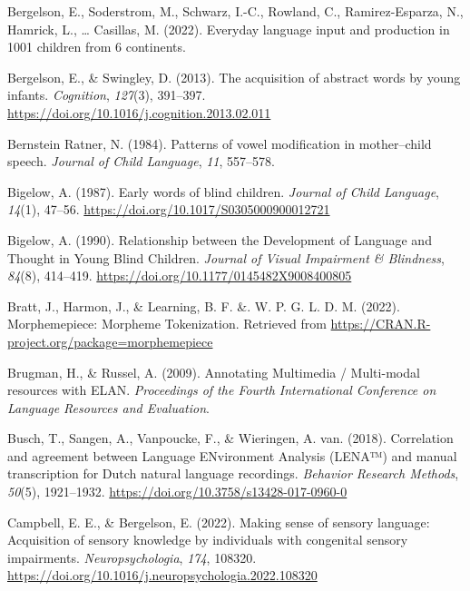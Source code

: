 \documentclass[
  man]{apa6}
\newlength{\cslhangindent}
\newlength{\cslentryspacingunit} %
\newenvironment{CSLReferences}[2] %
 {%
  \setlength{\parindent}{0pt}
  \ifodd #1
  \let\oldpar\par
  \def\par{\hangindent=\cslhangindent\oldpar}
  \fi
  \setlength{\parskip}{#2\cslentryspacingunit}
 }%
 {}
\begin{document}
\begin{CSLReferences}{1}{0}
\leavevmode{}%
Bergelson, E., Soderstrom, M., Schwarz, I.-C., Rowland, C., Ramirez-Esparza, N., Hamrick, L., \ldots{} Casillas, M. (2022). Everyday language input and production in 1001 children from 6 continents.

\leavevmode{}%
Bergelson, E., \& Swingley, D. (2013). The acquisition of abstract words by young infants. \emph{Cognition}, \emph{127}(3), 391--397. \url{https://doi.org/10.1016/j.cognition.2013.02.011}

\leavevmode{}%
Bernstein Ratner, N. (1984). Patterns of vowel modification in mother--child speech. \emph{Journal of Child Language}, \emph{11}, 557--578.

\leavevmode{}%
Bigelow, A. (1987). Early words of blind children. \emph{Journal of Child Language}, \emph{14}(1), 47--56. \url{https://doi.org/10.1017/S0305000900012721}

\leavevmode{}%
Bigelow, A. (1990). Relationship between the {Development} of {Language} and {Thought} in {Young} {Blind} {Children}. \emph{Journal of Visual Impairment \& Blindness}, \emph{84}(8), 414--419. \url{https://doi.org/10.1177/0145482X9008400805}

\leavevmode{}%
Bratt, J., Harmon, J., \& Learning, B. F. \&. W. P. G. L. D. M. (2022). Morphemepiece: {Morpheme} {Tokenization}. Retrieved from \url{https://CRAN.R-project.org/package=morphemepiece}

\leavevmode{}%
Brugman, H., \& Russel, A. (2009). Annotating {Multimedia} / {Multi}-modal resources with {ELAN}. \emph{Proceedings of the Fourth International Conference on Language Resources and Evaluation}.

\leavevmode{}%
Busch, T., Sangen, A., Vanpoucke, F., \& Wieringen, A. van. (2018). Correlation and agreement between {Language} {ENvironment} {Analysis} ({LENA}™) and manual transcription for {Dutch} natural language recordings. \emph{Behavior Research Methods}, \emph{50}(5), 1921--1932. \url{https://doi.org/10.3758/s13428-017-0960-0}

\leavevmode{}%
Campbell, E. E., \& Bergelson, E. (2022). Making sense of sensory language: {Acquisition} of sensory knowledge by individuals with congenital sensory impairments. \emph{Neuropsychologia}, \emph{174}, 108320. \url{https://doi.org/10.1016/j.neuropsychologia.2022.108320}


\end{CSLReferences}
\end{document}
